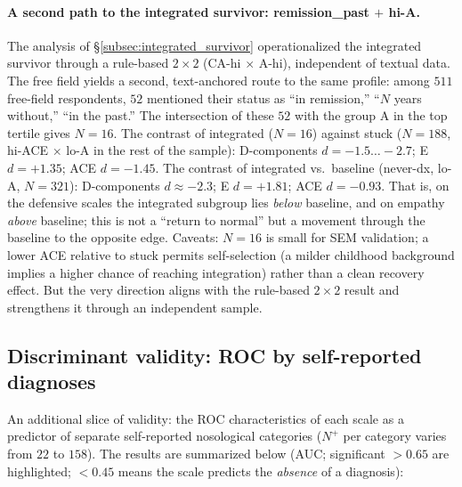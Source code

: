 \paragraph{A second path to the integrated survivor: remission\_past $+$ hi-A.} The analysis of §\ref{subsec:integrated_survivor} operationalized the integrated survivor through a rule-based $2\times 2$ (CA-hi $\times$ A-hi), independent of textual data. The free field yields a second, text-anchored route to the same profile: among $511$ free-field respondents, $52$ mentioned their status as ``in remission,'' ``$N$ years without,'' ``in the past.'' The intersection of these $52$ with the group A in the top tertile gives $N = 16$. The contrast of integrated ($N = 16$) against stuck ($N = 188$, hi-ACE $\times$ lo-A in the rest of the sample): D-components $d = -1.5 \dots -2.7$; E $d = +1.35$; ACE $d = -1.45$. The contrast of integrated vs.\ baseline (never-dx, lo-A, $N = 321$): D-components $d \approx -2.3$; E $d = +1.81$; ACE $d = -0.93$. That is, on the defensive scales the integrated subgroup lies \emph{below} baseline, and on empathy \emph{above} baseline; this is not a ``return to normal'' but a movement through the baseline to the opposite edge. Caveats: $N = 16$ is small for SEM validation; a lower ACE relative to stuck permits self-selection (a milder childhood background implies a higher chance of reaching integration) rather than a clean recovery effect. But the very direction aligns with the rule-based $2\times 2$ result and strengthens it through an independent sample.

\subsection{Discriminant validity: ROC by self-reported diagnoses}
\label{subsec:roc_validity}

An additional slice of validity: the ROC characteristics of each scale as a predictor of separate self-reported nosological categories ($N^+$ per category varies from $22$ to $158$). The results are summarized below (AUC; significant $> 0.65$ are highlighted; $< 0.45$ means the scale predicts the \emph{absence} of a diagnosis):

